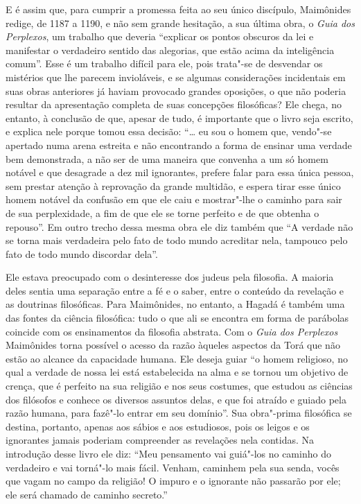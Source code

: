 E é assim que, para cumprir a promessa feita ao seu único discípulo,
Maimônides redige, de 1187 a 1190, e não sem grande hesitação, a sua
última obra, o \emph{Guia dos Perplexos}, um trabalho que deveria
``explicar os pontos obscuros da lei e manifestar o verdadeiro sentido
das alegorias, que estão acima da inteligência comum''. Esse é um
trabalho difícil para ele, pois trata"-se de desvendar os mistérios que
lhe parecem invioláveis, e se algumas considerações incidentais em suas
obras anteriores já haviam provocado grandes oposições, o que não
poderia resultar da apresentação completa de suas concepções
filosóficas? Ele chega, no entanto, à conclusão de que, apesar de tudo,
é importante que o livro seja escrito, e explica nele porque tomou essa
decisão: ``\ldots{} eu sou o homem que, vendo"-se apertado numa arena estreita
e não encontrando a forma de ensinar uma verdade bem demonstrada, a não
ser de uma maneira que convenha a um só homem notável e que desagrade a
dez mil ignorantes, prefere falar para essa única pessoa, sem prestar
atenção à reprovação da grande multidão, e espera tirar esse único
homem notável da confusão em que ele caiu e mostrar"-lhe o caminho para
sair de sua perplexidade, a fim de que ele se torne perfeito e de que
obtenha o repouso''. Em outro trecho dessa mesma obra ele diz também
que ``A verdade não se torna mais verdadeira pelo fato de todo mundo
acreditar nela, tampouco pelo fato de todo mundo discordar dela''.

Ele estava preocupado com o desinteresse dos judeus pela filosofia. A
maioria deles sentia uma separação entre a fé e o saber, entre o
conteúdo da revelação e as doutrinas filosóficas. Para Maimônides, no
entanto, a Hagadá é também uma das fontes da ciência filosófica: tudo o
que ali se encontra em forma de parábolas coincide com os ensinamentos
da filosofia abstrata. Com o \emph{Guia dos Perplexos} Maimônides torna
possível o acesso da razão àqueles aspectos da Torá que não
estão ao alcance da capacidade humana. Ele deseja guiar ``o homem
religioso, no qual a verdade de nossa lei está estabelecida na alma e se
tornou um objetivo de crença, que é perfeito na sua religião e nos seus
costumes, que estudou as ciências dos filósofos e conhece os diversos
assuntos delas, e que foi atraído e guiado pela razão humana, para
fazê"-lo entrar em seu domínio''. Sua obra"-prima filosófica se destina,
portanto, apenas aos sábios e aos estudiosos, pois os leigos e os
ignorantes jamais poderiam compreender as revelações nela contidas. Na
introdução desse livro ele diz: ``Meu pensamento vai guiá"-los no caminho
do verdadeiro e vai torná"-lo mais fácil. Venham, caminhem pela sua
senda, vocês que vagam no campo da religião! O impuro e o ignorante não
passarão por ele; ele será chamado de caminho secreto.''

